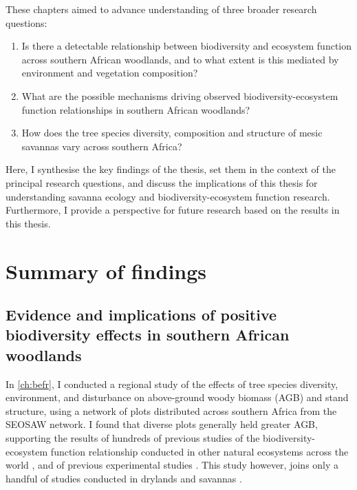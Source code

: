 \begin{refsection}
These chapters aimed to advance understanding of three broader research questions:

\begin{enumerate}
\item{Is there a detectable relationship between biodiversity and ecosystem function across southern African woodlands, and to what extent is this mediated by environment and vegetation composition?}
\item{What are the possible mechanisms driving observed biodiversity-ecosystem function relationships in southern African woodlands?}
\item{How does the tree species diversity, composition and structure of mesic savannas vary across southern Africa?}
\end{enumerate}

Here, I synthesise the key findings of the thesis, set them in the context of the principal research questions, and discuss the implications of this thesis for understanding savanna ecology and biodiversity-ecosystem function research. Furthermore, I provide a perspective for future research based on the results in this thesis.

\section{Summary of findings}
\label{discussion:sec:summ}

\subsection{Evidence and implications of positive biodiversity effects in southern African woodlands}
\label{discussion:ssec:ecology}

In \autoref{ch:befr}, I conducted a regional study of the effects of tree species diversity, environment, and disturbance on above-ground woody biomass (AGB) and stand structure, using a network of plots distributed across southern Africa from the SEOSAW network. I found that diverse plots generally held greater AGB, supporting the results of hundreds of previous studies of the biodiversity-ecosystem function relationship conducted in other natural ecosystems across the world \citep{Plas2019}, and of previous experimental studies \citep{Tilman2014}. This study however, joins only a handful of studies conducted in drylands and savannas \citep{Maestre2012, Grace2016, Plas2019, Clarke2017}. 


\end{refsection}
